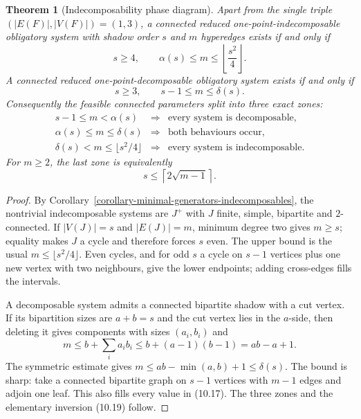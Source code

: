 \documentclass[a4paper,11pt,reqno]{amsart}
\theoremstyle{plain}
\newtheorem{theorem}{Theorem}[section]
\theoremstyle{definition}
\theoremstyle{remark}
\begin{document}
\begin{theorem}[Indecomposability phase diagram]
\label{theorem-indecomposability-phase-diagram}
Apart from the single triple $(|E(F)|,|V(F)|)=(1,3)$, a connected reduced
one-point-indecomposable obligatory system with shadow order $s$ and $m$
hyperedges exists if and only if
\[
s\ge4,
\qquad
\alpha(s)\le m\le\left\lfloor\frac{s^2}{4}\right\rfloor.
\tag{10.16}
\]
A connected reduced one-point-decomposable obligatory system exists if and
only if
\[
s\ge3,
\qquad
s-1\le m\le\delta(s).
\tag{10.17}
\]
Consequently the feasible connected parameters split into three exact zones:
\[
\begin{array}{rcl}
s-1\le m<\alpha(s)
 &\Longrightarrow& \text{every system is decomposable},\\
\alpha(s)\le m\le\delta(s)
 &\Longrightarrow& \text{both behaviours occur},\\
\delta(s)<m\le\lfloor s^2/4\rfloor
 &\Longrightarrow& \text{every system is indecomposable}.
\end{array}
\tag{10.18}
\]
For $m\ge2$, the last zone is equivalently
\[
s\le\left\lceil2\sqrt{m-1}\right\rceil.
\tag{10.19}
\]
\end{theorem}
\begin{proof}
By Corollary~\ref{corollary-minimal-generators-indecomposables}, the nontrivial
indecomposable systems are $J^+$ with $J$ finite, simple, bipartite and
$2$-connected.  If $|V(J)|=s$ and $|E(J)|=m$, minimum degree two gives
$m\ge s$; equality makes $J$ a cycle and therefore forces $s$ even.  The
upper bound is the usual $m\le\lfloor s^2/4\rfloor$.  Even cycles, and for odd
$s$ a cycle on $s-1$ vertices plus one new vertex with two neighbours, give
the lower endpoints; adding cross-edges fills the intervals.

A decomposable system admits a connected bipartite shadow with a cut vertex.
If its bipartition sizes are $a+b=s$ and the cut vertex lies in the $a$-side,
then deleting it gives components with sizes $(a_i,b_i)$ and
\[
m\le b+\sum_i a_i b_i
 \le b+(a-1)(b-1)=ab-a+1.
\]
The symmetric estimate gives $m\le ab-\min(a,b)+1\le\delta(s)$.  The bound is
sharp: take a connected bipartite graph on $s-1$ vertices with $m-1$ edges and
adjoin one leaf.  This also fills every value in (10.17).  The three zones and
the elementary inversion (10.19) follow.
\end{proof}
\end{document}
